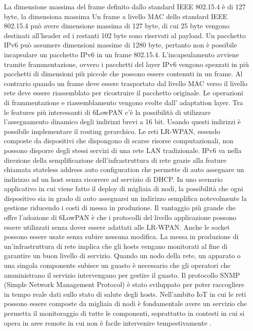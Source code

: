 \documentclass[12pt,a4paper,openright,twoside]{report}
\begin{document}
La dimensione massima del frame definito dallo standard IEEE 802.15.4 \`e di 127 byte, la dimensiona massima 
Un frame a livello MAC dello standard IEEE 802.15.4 pu\`o avere dimensione massima di 127 byte, di cui 25 byte vengono destinati all'header ed i restanti 102 byte sono riservati al payload.
Un pacchetto IPv6 pu\`o assumere dimensioni massime di 1280 byte, pertanto non \`e possibile incapsulare un pacchetto IPv6 in un frame 802.15.4. 
L'incapsulamento avviene tramite frammentazione, ovvero i pacchetti del layer IPv6 vengono spezzati in pi\`u pacchetti di dimensioni pi\`u piccole che possono essere contenuti in un frame. 
Al contrario quando un frame deve essere trasportato dal livello MAC verso il livello rete deve essere riassemblato per ricostruire il pacchetto originale.
Le operazioni di frammentazione e riassemblamento vengono svolte dall' adaptation layer.
Tra le features pi\`u interessanti di 6LowPAN c'\`e la possibilit\`a di utilizzare l'assegnamento dinamico degli indirizzi brevi a 16 bit. Usando questi indirizzi \`e possibile implementare il routing gerarchico. 	
Le reti LR-WPAN, essendo composte da dispositivi che dispongono di scarse risorse computazionali, non possono disporre degli stessi servizi di una rete LAN tradizionale. 
IPv6 va nella direzione della semplificazione dell'infrastruttura di rete grazie alla feature chiamata stateless address auto configuration che permette di auto assegnare un indirizzo ad un host senza ricorrere ad servizio di DHCP. In uno scenario applicativo in cui viene fatto il deploy di migliaia di nodi, la possibilit\`a che ogni dispositivo sia in grado di auto assegnarsi un indirizzo semplifica notevolmente la gestione riducendo i costi di messa in produzione.    
Il vantaggio pi\`u grande che offre l'adozione di 6LowPAN \`e che i protocolli del livello applicazione possono essere utilizzati senza dover essere adattati alle LR-WPAN. 
Anche le socket possono essere usate senza subire nessuna modifica.
La messa in produzione di un'infrastruttura di rete implica che gli hosts vengano monitorati al fine di garantire un buon livello di servizio. 
Quando un nodo della rete, un apparato o una singola componente subisce un guasto \`e necessario che gli operatori che amministrano il servizio intervengano per gestire il guasto.  
Il protocollo SNMP (Simple Network Management Protocol) \`e stato sviluppato per poter raccogliere in tempo reale dati sullo stato di salute degli hosts. 
Nell'ambito IoT in cui le reti possono essere composte da migliaia di nodi \`e fondamentale avere un servizio che permetta il monitoraggio di tutte le componenti, soprattutto in contesti in cui si opera in aree remote in cui non \`e facile intervenire tempestivamente \cite{K19}.
\end{document}

